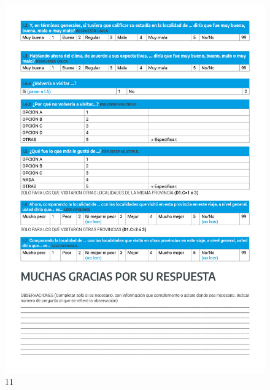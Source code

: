 \documentclass[
]{book}
\begin{document}
\begin{figure}
\includegraphics[width=17.22in]{imagenes/graf011} \caption{11}\label{fig:011}
\end{figure}

  
\end{document}
